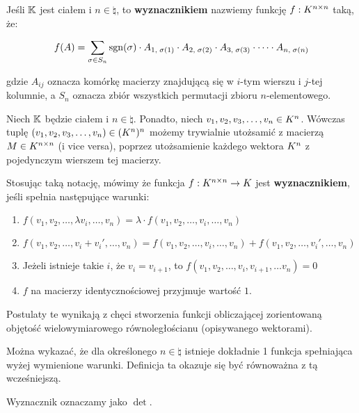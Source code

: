 \begin{definition}
	Jeśli \(\mathbb{K}\) jest ciałem i \(n \in \natural\), to \textbf{wyznacznikiem} nazwiemy funkcję \(f : K^{n \times n}\) taką, że:

	\[
		f(A) = \sum_{\sigma \in S_n} \operatorname{sgn}(\sigma) \cdot A_{1, \; \sigma(1)} \cdot A_{2, \; \sigma(2)} \cdot A_{3, \; \sigma(3)} \cdot \dots \cdot A_{n, \; \sigma(n)}
	\]

	gdzie \(A_{ij}\) oznacza komórkę macierzy znajdującą się w \(i\)-tym wierszu i \(j\)-tej kolumnie, a \(S_n\) oznacza zbiór wszystkich permutacji zbioru \(n\)-elementowego.

\end{definition}

\begin{definition}
	Niech \(\mathbb{K}\) będzie ciałem i \(n \in \natural\). Ponadto, niech \(v_1, v_2, v_3, \dots, v_n \in K^{n}\). Wówczas tuplę \((v_1, v_2, v_3, \dots, v_n) \in (K^{n})^{n}\) możemy trywialnie utożsamić z macierzą \(M \in K^{n \times n}\) (i vice versa), poprzez utożsamienie każdego wektora \(K^{n}\) z pojedynczym wierszem tej macierzy.

	Stosując taką notację, mówimy że funkcja \(f: K^{n \times n} \rightarrow K\) jest \textbf{wyznacznikiem}, jeśli spełnia następujące warunki:

	\begin{enumerate}
		\item \(f(v_1, v_2, \dots, \lambda v_i, \dots, v_n) = \lambda \cdot f(v_1, v_2, \dots, v_i, \dots, v_n) \)
		\item \(f(v_1, v_2, \dots, v_i + v_{i}', \dots, v_n) = f(v_1, v_2, \dots, v_i, \dots, v_n) + f(v_1, v_2, \dots, v_{i}', \dots, v_n) \)
		\item Jeżeli istnieje takie \(i\), że \(v_i = v_{i+1}\), to \(f(v_1, v_2, \dots, v_i, v_{i+1}, \dots v_n) = 0\)
		\item \(f\) na macierzy identycznościowej przyjmuje wartość \(1\).
	\end{enumerate}

	Postulaty te wynikają z chęci stworzenia funkcji obliczającej zorientowaną objętość wielowymiarowego równoległościanu (opisywanego wektorami).

	Można wykazać, że dla określonego \(n \in \natural\) istnieje dokładnie 1 funkcja spełniająca wyżej wymienione warunki. Definicja ta okazuje się być równoważna z tą wcześniejszą.

\end{definition}

Wyznacznik oznaczamy jako \(\det\).